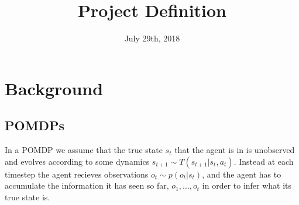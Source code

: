 \documentclass{article}
\title{Project Definition}
\date{July 29th, 2018}
\begin{document}
\maketitle

\section{Background}
    \subsection{POMDPs}
        In a POMDP we assume that the true state $s_t$ that the
        agent is in is unobserved and evolves according to some dynamics $s_{t+1} \sim T(s_{t+1}|s_t, a_t)$.
        Instead at each timestep the agent recieves observations $o_t \sim p(o_t | s_t)$, and the agent has
        to accumulate the information it has seen so far, $o_1,...,o_t$ in order to infer what its true state is.
        
\end{document}
